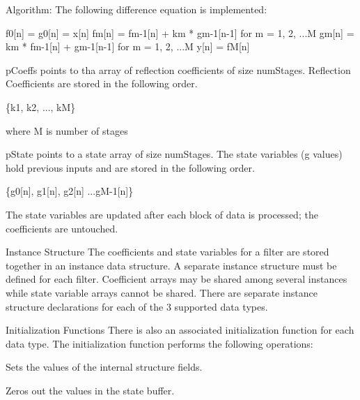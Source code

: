 \begin{DoxyParagraph}{Algorithm\-: }
 The following difference equation is implemented\-: 
\begin{DoxyPre}   
    f0[n] = g0[n] = x[n]   
    fm[n] = fm-1[n] + km * gm-1[n-1] for m = 1, 2, ...M   
    gm[n] = km * fm-1[n] + gm-1[n-1] for m = 1, 2, ...M   
    y[n] = fM[n]   
 \end{DoxyPre}
 
\end{DoxyParagraph}
\begin{DoxyParagraph}{}
{\ttfamily p\-Coeffs} points to tha array of reflection coefficients of size {\ttfamily num\-Stages}. Reflection Coefficients are stored in the following order. 
\end{DoxyParagraph}
\begin{DoxyParagraph}{}

\begin{DoxyPre}   
    \{k1, k2, ..., kM\}   
 \end{DoxyPre}
 where M is number of stages 
\end{DoxyParagraph}
\begin{DoxyParagraph}{}
{\ttfamily p\-State} points to a state array of size {\ttfamily num\-Stages}. The state variables (g values) hold previous inputs and are stored in the following order. 
\begin{DoxyPre}   
    \{g0[n], g1[n], g2[n] ...gM-1[n]\}   
 \end{DoxyPre}
 The state variables are updated after each block of data is processed; the coefficients are untouched. 
\end{DoxyParagraph}
\begin{DoxyParagraph}{Instance Structure }
The coefficients and state variables for a filter are stored together in an instance data structure. A separate instance structure must be defined for each filter. Coefficient arrays may be shared among several instances while state variable arrays cannot be shared. There are separate instance structure declarations for each of the 3 supported data types.
\end{DoxyParagraph}
\begin{DoxyParagraph}{Initialization Functions }
There is also an associated initialization function for each data type. The initialization function performs the following operations\-:
\begin{DoxyItemize}
\item Sets the values of the internal structure fields.
\item Zeros out the values in the state buffer.
\end{DoxyItemize}
\end{DoxyParagraph}
